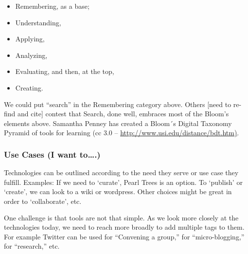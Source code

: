 \begin{itemize}
\item
  Remembering, as a base;
\end{itemize}

\begin{itemize}
\item
  Understanding,
\end{itemize}

\begin{itemize}
\item
  Applying,
\end{itemize}

\begin{itemize}
\item
  Analyzing,
\end{itemize}

\begin{itemize}
\item
  Evaluating, and then, at the top,
\end{itemize}

\begin{itemize}
\item
  Creating.
\end{itemize}

We could put ``search'' in the Remembering category above. Others
{[}need to re-find and cite{]} contest that Search, done well, embraces
most of the Bloom's elements above. Samantha Penney has created a
Bloom´s Digital Taxonomy Pyramid of tools for learning (cc 3.0 --
\href{http://www.usi.edu/distance/bdt.htm)}{http://www.usi.edu/distance/bdt.htm)}.


\subsubsection{Use Cases (I want to\ldots{}.)}

Technologies can be outlined according to the need they serve or use
case they fulfill. Examples: If we need to `curate', Pearl Trees is an
option. To `publish' or `create', we can look to a wiki or wordpress.
Other choices might be great in order to `collaborate', etc.

One challenge is that tools are not that simple. As we look more closely
at the technologies today, we need to reach more broadly to add multiple
tags to them. For example Twitter can be used for ``Convening a group,''
for ``micro-blogging,'' for ``research,'' etc.

